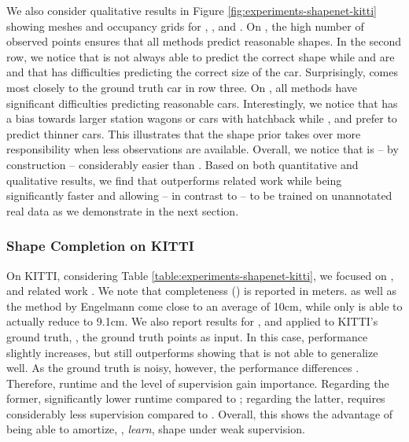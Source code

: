 We also consider qualitative results in Figure \ref{fig:experiments-shapenet-kitti} showing meshes and occupancy grids for \ML, \cite{Engelmann2016GCPR}, \AML and \Sup. On \clean, the high number of observed points ensures that all methods predict reasonable shapes. In the second row, we notice that \Sup is not always able to predict the correct shape while \AML and \ML are and that \cite{Engelmann2016GCPR} has difficulties predicting the correct size of the car. Surprisingly, \ML comes most closely to the ground truth car in row three.  On \noisy, all methods have significant difficulties predicting reasonable cars. Interestingly, we notice that \cite{Engelmann2016GCPR} has a bias towards larger station wagons or cars with hatchback while \AML, \ML and \Sup prefer to predict thinner cars. This illustrates that the shape prior takes over more responsibility when less observations are available. Overall, we notice that \clean is -- by construction -- considerably easier than \noisy. Based on both quantitative and qualitative results, we find that \AML outperforms related work \cite{Engelmann2016GCPR} while being significantly faster and allowing -- in contrast to \Sup\xspace-- to be trained on unannotated real data as we demonstrate in the next section.

\vspace*{-6px}
\subsubsection{Shape Completion on KITTI}



On KITTI, considering Table \ref{table:experiments-shapenet-kitti}, we focused on \AML, \Sup and related work \cite{Engelmann2016GCPR}. We note that completeness (\Compl) is reported in meters. \Sup as well as the method by Engelmann \etal \cite{Engelmann2016GCPR} come close to an average of 10cm, while only \AML is able to actually reduce \Compl to 9.1cm. We also report results for \AML, \Sup and \cite{Engelmann2016GCPR} applied to KITTI's ground truth, \ie,  the ground truth points as input. In this case, performance slightly increases, but \AML still outperforms \Sup showing that \Sup is not able to generalize well. As the ground truth is noisy, however, the performance differences . Therefore, runtime and the level of supervision gain importance. Regarding the former, \AML {} significantly lower runtime compared to \cite{Engelmann2016GCPR}; regarding the latter, \AML requires considerably less supervision compared to \Sup. Overall, this shows the advantage of being able to amortize, \ie, \emph{learn}, shape  under weak supervision.

